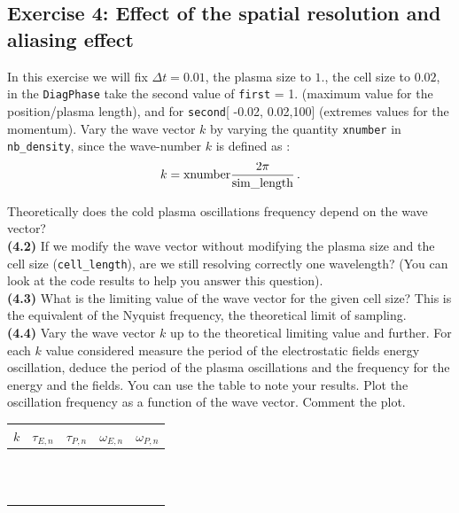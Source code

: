 \documentclass[11pt,a4paper]{article}
\begin{document}
\subsection*{Exercise 4: Effect of the spatial resolution and aliasing effect}

In this exercise we will fix $\Delta t = 0.01$, the plasma size to $1.$, the cell size to $0.02$, 
 in the \texttt{DiagPhase} take the second value of   \texttt{first} = 1. (maximum value for the position/plasma length), and for \texttt{second}[ -0.02, 0.02,100] (extremes values for the momentum). 
Vary the wave vector $k$ by varying the quantity \texttt{xnumber} in \texttt{nb\_density}, since the  
 wave-number $k$ is defined as :
\begin{eqnarray}\label{eq_k}
k = {\rm xnumber} \frac{2\pi}{\rm sim\_length}\,.
\end{eqnarray}


  Theoretically does the cold plasma oscillations frequency depend on the wave vector? \\
{\bf (4.2)} If we modify the wave vector without modifying the plasma size and the cell size (\texttt{cell\_length}), are we still resolving correctly one wavelength? (You can look at the code results to help you answer this question). \\
{\bf (4.3)} What is the limiting value of the wave vector for the given cell size? This is the equivalent of the Nyquist frequency, the theoretical limit of sampling. \\
{\bf (4.4)} Vary the wave vector $k$ up to the theoretical limiting value  and further. For each $k$ value considered measure the period of the electrostatic fields energy oscillation, deduce the period of the plasma oscillations and the frequency for the energy and the fields. 
You can use the table to note your results. Plot the oscillation frequency as a function of the wave vector. Comment the plot. \\


\begin{tabularx}{\textwidth}{X|X|X|X|X}
\centering\large\textbf{$k$} & \centering\large\textbf{$\tau_{E,n}$} & \centering\large\textbf{$\tau_{P,n}$} &  \centering\large\textbf{$\omega_{E,n}$} & \centering\arraybackslash\large\textbf{$\omega_{P,n}$} \\
\hline
 & & & & \\  & & & & \\ \hline  & & & & \\  & & & & \\ \hline  & & & & \\  & & & & \\ \hline  & & & & \\  & & & & \\ \hline  & & & & \\  & & & & \\ \hline  & & & & \\  & & & & \\ 
\end{tabularx}
\end{document}
